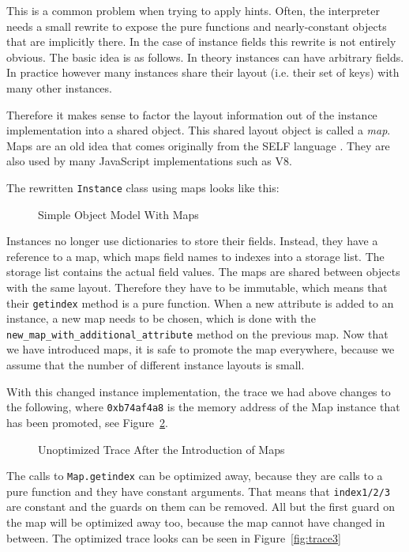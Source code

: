 \documentclass{sig-alternate}
\let\oldcite=\cite
\renewcommand\cite[1]{\ifthenelse{\equal{#1}{XXX}}{[citation~needed]}{\oldcite{#1}}}
\begin{document}
This is a common problem when trying to apply hints. Often, the interpreter
needs a small rewrite to expose the pure functions and nearly-constant objects
that are implicitly there. In the case of instance fields this rewrite is not
entirely obvious. The basic idea is as follows. In theory instances can have
arbitrary fields. In practice however many instances share their layout (i.e.
their set of keys) with many other instances.

Therefore it makes sense to factor the layout information out of the instance
implementation into a shared object. This shared layout object is called a
\emph{map}. Maps are an old idea that comes originally from the SELF language \cite{XXX}. They are
also used by many JavaScript implementations such as V8.

The rewritten \texttt{Instance} class using maps looks like this:

\begin{figure}

\caption{Simple Object Model With Maps}
\label{fig:maps}
\end{figure}

Instances no longer use dictionaries to store their fields. Instead, they have a
reference to a map, which maps field names to indexes into a storage list. The
storage list contains the actual field values. The maps are shared between
objects with the same layout. Therefore they have to be immutable, which means
that their \texttt{getindex} method is a pure function. When a new attribute is added
to an instance, a new map needs to be chosen, which is done with the
\texttt{new\_map\_with\_additional\_attribute} method on the previous map. Now that we have
introduced maps, it is safe to promote the map everywhere, because we assume
that the number of different instance layouts is small.

With this changed instance implementation, the trace we had above changes to the
following, where \texttt{0xb74af4a8} is the memory address of the Map instance that
has been promoted, see Figure~\ref{fig:trace2}.

\begin{figure}

\caption{Unoptimized Trace After the Introduction of Maps}
\label{fig:trace2}
\end{figure}

The calls to \texttt{Map.getindex} can be optimized away, because they are calls to
a pure function and they have constant arguments. That means that \texttt{index1/2/3}
are constant and the guards on them can be removed. All but the first guard on
the map will be optimized away too, because the map cannot have changed in
between. The optimized trace looks can be seen in Figure~\ref{fig:trace3}
\end{document}
